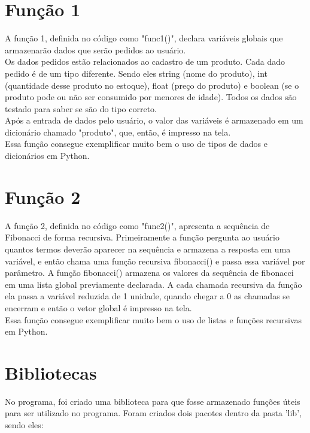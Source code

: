 \documentclass[12pt]{article}
\begin{document}
\section{Função 1}
A função 1, definida no código como "func1()", declara variáveis globais que armazenarão dados que serão pedidos ao usuário.\\
Os dados pedidos estão relacionados ao cadastro de um produto. Cada dado pedido é de um tipo diferente. Sendo eles string (nome do produto), int (quantidade desse produto no estoque), float (preço do produto) e boolean (se o produto pode ou não ser consumido por menores de idade). Todos os dados são testado para saber se são do tipo correto.\\
Após a entrada de dados pelo usuário, o valor das variáveis é armazenado em um dicionário chamado "produto", que, então, é impresso na tela.\\
Essa função consegue exemplificar muito bem o uso de tipos de dados e dicionários em Python.





\section{Função 2}
A função 2, definida no código como "func2()", apresenta a sequência de Fibonacci de forma recursiva. Primeiramente a função pergunta ao usuário quantos termos deverão aparecer na sequência e armazena a resposta em uma variável, e então chama uma função recursiva fibonacci() e passa essa variável por parâmetro. A função fibonacci() armazena os valores da sequência de fibonacci em uma lista global previamente declarada. A cada chamada recursiva da função ela passa a variável reduzida de 1 unidade, quando chegar a 0 as chamadas se encerram e então o vetor global é impresso na tela.\\
Essa função consegue exemplificar muito bem o uso de listas e funções recursivas em Python.

\section{Bibliotecas}
No programa, foi criado uma biblioteca para que fosse armazenado funções úteis para ser utilizado no programa. 
Foram criados dois pacotes dentro da pasta 'lib', sendo eles:
\end{document}

